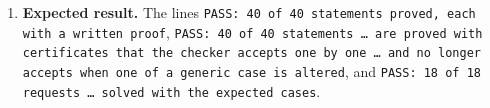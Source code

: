\documentclass[11pt,a4paper]{article}
\begin{document}
\begin{enumerate}
\item \textbf{Expected result.} The lines \texttt{PASS: 40 of 40 statements proved, each with a written proof}, \texttt{PASS: 40 of 40 statements \dots{} are proved with certificates that the checker accepts one by one \dots{} and no longer accepts when one of a generic case is altered}, and \texttt{PASS: 18 of 18 requests \dots{} solved with the expected cases}.
\end{enumerate}
\end{document}
